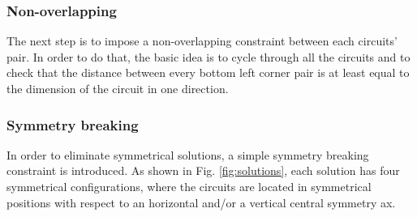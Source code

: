 \documentclass[a4paper, 12pt]{article}
\begin{document}
\subsubsection{Non-overlapping}
The next step is to impose a non-overlapping constraint between each circuits' pair. In order to do that, the basic idea is to cycle through all the circuits and to check that the distance between every bottom left corner pair is at least equal to the dimension of the circuit in one direction.

\subsubsection{Symmetry breaking}\label{sec:symmetry}

In order to eliminate symmetrical solutions, a simple symmetry breaking constraint is introduced. As shown in Fig. \ref{fig:solutions}, each solution has four symmetrical configurations, where the circuits are located in symmetrical positions with respect to an horizontal and/or a vertical central symmetry ax.
\end{document}
